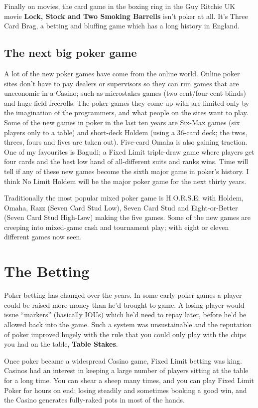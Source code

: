 Finally on movies, the card game in the boxing ring in the Guy Ritchie
UK movie \textbf{Lock, Stock and Two Smoking Barrells} isn't poker at
all. It's Three Card Brag, a betting and bluffing game which has a
long history in England.

\subsection{The next big poker game}

A lot of the new poker games have come from the online world. Online
poker sites don't have to pay dealers or supervisors so they can run
games that are uneconomic in a Casino; such as microstakes games (two
cent/four cent blinds) and huge field freerolls. The poker games they
come up with are limited only by the imagination of the programmers,
and what people on the sites want to play. Some of the new games
in poker in the last ten years are Six-Max games (six players only to
a table) and short-deck Holdem (using a 36-card deck; the twos,
threes, fours and fives are taken out). Five-card Omaha is also
gaining traction. One of my favourites is Bagudi; a Fixed Limit
triple-draw game where players get four cards and the best low hand of
all-different suits and ranks wins. Time will tell if any of these new
games become the sixth major game in poker's history. I think No Limit
Holdem will be the major poker game for the next thirty years.

Traditionally the most popular mixed poker game is H.O.R.S.E; with
Holdem, Omaha, Razz (Seven Card Stud Low), Seven Card Stud and
Eight-or-Better (Seven Card Stud High-Low) making the five games.
Some of the new games are creeping into mixed-game cash and tournament
play; with eight or eleven different games now seen.

\section{The Betting}

Poker betting has changed over the years. In some early poker games
a player could be raised more money than he'd brought to
game. A losing player would issue ``markers'' (basically IOUs) which
he'd need to repay later, before he'd be allowed back into the
game. Such a system was unsustainable and the reputation of poker
improved hugely with the rule that you could only play with the
chips you had on the table, \textbf{Table Stakes}.

Once poker became a widespread Casino game, Fixed Limit betting was
king. Casinos had an interest in keeping a large number of players
sitting at the table for a long time. You can shear a sheep many times,
and you can play Fixed Limit Poker for hours on end; losing steadily
and sometimes booking a good win, and the Casino generates fully-raked
pots in most of the hands.

